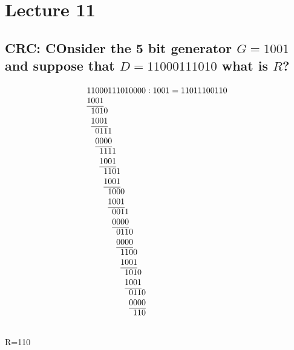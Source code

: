 \documentclass[12pt, a4paper]{article}
\begin{document}
	\section{Lecture 11}
		\subsection{CRC: COnsider the 5 bit generator $G=1001$ and suppose that $D=11000111010$ what is $R$?}
			\[\setlength{\arraycolsep}{0pt}
			\begin{array}[t]{*{14}{l}}
				1&1&0&0&0&1&1&1&0&1&0&0&0&0\\
				1&0&0&1&\\ \cline{1-4}
				&1&0&1&0&\\
				&1&0&0&1&&&&&&&&&\\\cline{2-5}
				&&0&1&1&1&&&&&&&&\\
				&&0&0&0&0&&&&&&&&\\\cline{3-6}
				&&&1&1&1&1&&&&&&&\\
				&&&1&0&0&1&&&&&&&\\\cline{4-7}
				&&&&1&1&0&1&&&&&\\
				&&&&1&0&0&1&&&&&\\\cline{5-8}
				&&&&&1&0&0&0&&&\\
				&&&&&1&0&0&1&&&\\\cline{6-9}
				&&&&&&0&0&1&1&&\\
				&&&&&&0&0&0&0&&\\\cline{7-10}
				&&&&&&&0&1&1&0&&\\
				&&&&&&&0&0&0&0&&\\\cline{8-11}
				&&&&&&&&1&1&0&0\\
				&&&&&&&&1&0&0&1\\\cline{9-12}
				&&&&&&&&&1&0&1&0\\
				&&&&&&&&&1&0&0&1\\\cline{10-13}
				&&&&&&&&&&0&1&1&0\\
				&&&&&&&&&&0&0&0&0\\\cline{11-14}
				&&&&&&&&&&&1&1&0\\
			\end{array}:1001=11011100110
			\]\\
			R=110
\end{document}

